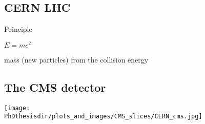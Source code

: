 \subsection*{CERN LHC}
\begin{frame}{Principle}

\begin{center}
{\LARGE $E = mc^2$}

\vfill

mass (new particles) from the collision energy
\end{center}

\end{frame}

%


\subsection*{The CMS detector}


%
%


\begin{frame}
\vspace{-2.3pt}
\begin{center}
\texttt{[image: \\PhDthesisdir/plots\_and\_images/CMS\_slices/CERN\_cms.jpg]}
\end{center}
\vspace{-7pt}
\end{frame}


%
